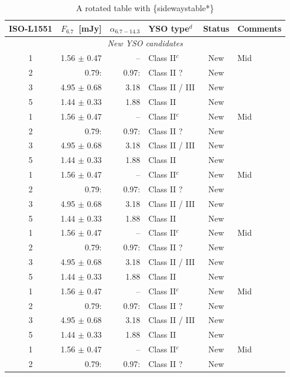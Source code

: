 \documentclass{aa}
\begin{document}
\begin{appendix}
\begin{table}
\caption{A rotated table with \{sidewaystable*\}}
\label{table:4} 
\centering
\begin{tabular}{crrlcl}
\hline        
ISO-L1551 & $F_{6.7}$~[mJy] & $\alpha_{6.7-14.3}$ & YSO type$^{d}$ & Status & Comments \\
\hline
  \multicolumn{6}{c}{\it New YSO candidates}\\ %
\hline
  1 & 1.56 $\pm$ 0.47 & --    & Class II$^{c}$ & New & Mid\\
  2 & 0.79:           & 0.97: & Class II ?     & New & \\
  3 & 4.95 $\pm$ 0.68 & 3.18  & Class II / III & New & \\
  5 & 1.44 $\pm$ 0.33 & 1.88  & Class II       & New & \\
  1 & 1.56 $\pm$ 0.47 & --    & Class II$^{c}$ & New & Mid\\
  2 & 0.79:           & 0.97: & Class II ?     & New & \\
  3 & 4.95 $\pm$ 0.68 & 3.18  & Class II / III & New & \\
  5 & 1.44 $\pm$ 0.33 & 1.88  & Class II       & New & \\
  1 & 1.56 $\pm$ 0.47 & --    & Class II$^{c}$ & New & Mid\\
  2 & 0.79:           & 0.97: & Class II ?     & New & \\
  3 & 4.95 $\pm$ 0.68 & 3.18  & Class II / III & New & \\
  5 & 1.44 $\pm$ 0.33 & 1.88  & Class II       & New & \\
  1 & 1.56 $\pm$ 0.47 & --    & Class II$^{c}$ & New & Mid\\
  2 & 0.79:           & 0.97: & Class II ?     & New & \\
  3 & 4.95 $\pm$ 0.68 & 3.18  & Class II / III & New & \\
  5 & 1.44 $\pm$ 0.33 & 1.88  & Class II       & New & \\
  1 & 1.56 $\pm$ 0.47 & --    & Class II$^{c}$ & New & Mid\\
  2 & 0.79:           & 0.97: & Class II ?     & New & \\
  3 & 4.95 $\pm$ 0.68 & 3.18  & Class II / III & New & \\
  5 & 1.44 $\pm$ 0.33 & 1.88  & Class II       & New & \\
  1 & 1.56 $\pm$ 0.47 & --    & Class II$^{c}$ & New & Mid\\
  2 & 0.79:           & 0.97: & Class II ?     & New & \\

\end{tabular}
\end{table}
\end{appendix}
\end{document}
